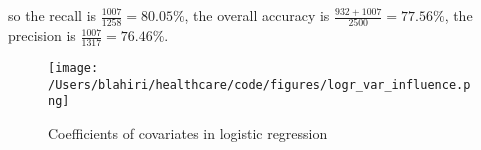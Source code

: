 so the recall is $\frac{1007}{1258} = 80.05\%$, the overall accuracy is $\frac{932 + 1007}{2500} = 77.56\%$, the precision is $\frac{1007}{1317} = 76.46\%$. 

\begin{figure}[!h]
    \centering
    \texttt{[image: /Users/blahiri/healthcare/code/figures/logr\_var\_influence.png]}
    \caption{\small Coefficients of covariates in logistic regression}
    \label{fig:logr_var_influence}
\end{figure}



